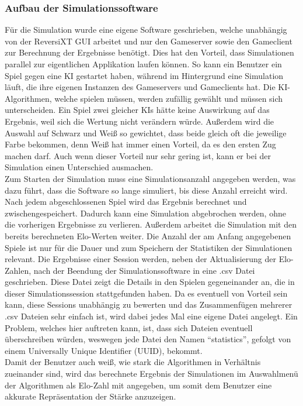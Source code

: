 \documentclass[12pt,a4paper,bibliography=totocnumbered,listof=totocnumbered]{article}
\begin{document}
\subsubsection{Aufbau der Simulationssoftware}
Für die Simulation wurde eine eigene Software geschrieben, welche unabhängig von der \ac{ReversiXT} \ac{GUI} arbeitet und nur den Gameserver 
sowie den Gameclient zur Berechnung der Ergebnisse benötigt. Dies hat den Vorteil, dass Simulationen parallel zur eigentlichen Applikation laufen können.
So kann ein Benutzer ein Spiel gegen eine \ac{KI} gestartet haben, während im Hintergrund eine Simulation läuft, die ihre eigenen Instanzen des 
Gameservers und Gameclients hat. 
Die \ac{KI}-Algorithmen, welche spielen müssen, werden zufällig gewählt und müssen sich unterscheiden. Ein Spiel zwei gleicher KIs hätte keine Auswirkung auf das 
Ergebnis, weil sich die Wertung nicht verändern würde. Außerdem wird die Auswahl auf Schwarz und Weiß so gewichtet, dass beide gleich oft die jeweilige Farbe bekommen, 
denn Weiß hat immer einen Vorteil, da es den ersten Zug machen darf. Auch wenn dieser 
Vorteil nur sehr gering ist, kann er bei der Simulation einen Unterschied ausmachen.
\\
Zum Starten der Simulation muss eine Simulationsanzahl angegeben werden, was dazu führt, dass die Software so lange simuliert, bis diese Anzahl erreicht wird.
Nach jedem abgeschlossenen Spiel wird das Ergebnis berechnet und zwischengespeichert. Dadurch kann eine Simulation abgebrochen werden, ohne die vorherigen 
Ergebnisse zu verlieren. Außerdem arbeitet die Simulation mit den bereits berechneten Elo-Werten weiter. Die Anzahl der am Anfang angegebenen 
Spiele ist nur für die Dauer und zum Speichern der Statistiken der Simulationen relevant. 
Die Ergebnisse einer Session werden, neben der Aktualisierung der Elo-Zahlen, nach der Beendung der Simulationssoftware in eine .csv Datei 
geschrieben. Diese Datei zeigt die Details in den Spielen gegeneinander an, die in dieser Simulationssession stattgefunden haben.
Da es eventuell von Vorteil sein kann, diese Sessions unabhängig zu bewerten und das Zusammenfügen mehrerer .csv Dateien sehr einfach ist, 
wird dabei jedes Mal eine eigene Datei angelegt. Ein Problem, welches hier auftreten kann, ist, dass sich Dateien eventuell überschreiben würden, weswegen 
jede Datei den Namen ``statistics'', gefolgt von einem Universally Unique Identifier (UUID), bekommt.
\\
Damit der Benutzer auch weiß, wie stark die Algorithmen in Verhältnis zueinander sind, wird das berechnete Ergebnis der Simulationen im Auswahlmenü der 
Algorithmen als Elo-Zahl mit angegeben, um somit dem Benutzer eine akkurate Repräsentation der Stärke anzuzeigen.
\end{document}
